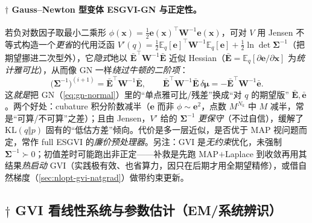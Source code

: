 \paragraph{$\dagger$ Gauss--Newton 型变体 ESGVI-GN 与正定性。}
若负对数因子取最小二乘形 $\phi(\mathbf{x})=\tfrac12\mathbf{e}(\mathbf{x})^\top\mathbf{W}^{-1}\mathbf{e}(\mathbf{x})$，可对 $V$ 用 Jensen 不等式构造一个\emph{更省}的代用泛函 $V'(q)=\tfrac12\mathbb{E}_q[\mathbf{e}]^\top\mathbf{W}^{-1}\mathbb{E}_q[\mathbf{e}]+\tfrac12\ln\det\boldsymbol{\Sigma}^{-1}$（把期望挪进二次型外），它\emph{隐式}地以 $\bar{\mathbf{E}}^\top\mathbf{W}^{-1}\bar{\mathbf{E}}$ 近似 Hessian（$\bar{\mathbf{E}}=\mathbb{E}_q[\partial\mathbf{e}/\partial\mathbf{x}]$ 为\emph{统计雅可比}），从而像 GN 一样\emph{绕过牛顿的二阶项}：
\begin{equation}
  \big(\boldsymbol{\Sigma}^{-1}\big)^{(i+1)}=\bar{\mathbf{E}}^\top\mathbf{W}^{-1}\bar{\mathbf{E}},\qquad
  \bar{\mathbf{E}}^\top\mathbf{W}^{-1}\bar{\mathbf{E}}\,\delta\boldsymbol{\mu}=-\bar{\mathbf{E}}^\top\mathbf{W}^{-1}\bar{\mathbf{e}}.
  \label{eq:gvi-gn}
\end{equation}
这\emph{就是}把 GN（\cref{eq:gn-normal}）里的“单点雅可比/残差”换成“对 $q$ 的期望版” $\bar{\mathbf{E}},\bar{\mathbf{e}}$。两个好处：cubature 积分阶数减半（$\mathbf{e}$ 而非 $\phi\sim\mathbf{e}^2$，点数 $M^{N_k}$ 中 $M$ 减半，常是“可算/不可算”之差）；且由 Jensen，$V'$ 给的 $\boldsymbol{\Sigma}^{-1}$ \emph{更保守}（不过自信），缓解了 $\mathrm{KL}(q\Vert p)$ 固有的“低估方差”倾向。代价是多一层近似，是否优于 MAP 视问题而定，常作 full ESGVI 的\emph{廉价预处理器}。另注：GVI 是\emph{无约束}优化，未强制 $\boldsymbol{\Sigma}^{-1}\succ0$；初值差时可能跑出非正定——补救是先跑 MAP$+$Laplace 到收敛再用其结果\emph{热启动} GVI（实践极有效、也省算力，因只在后期才用全期望精修），或借自然梯度（\cref{sec:nlopt-gvi-natgrad}）做带约束更新\cite{barfoot2024state}。

\subsection{$\dagger$ GVI 看线性系统与参数估计（EM/系统辨识）}
\label{sec:nlopt-gvi-param}

